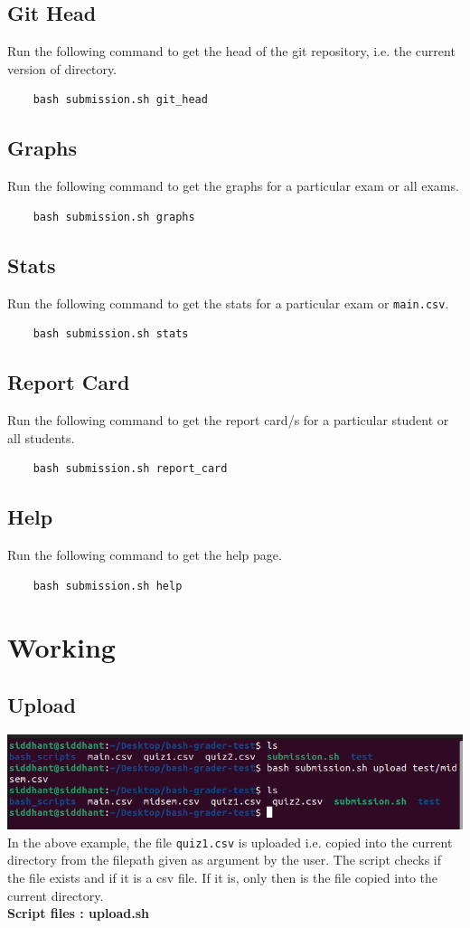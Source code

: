 \documentclass{article}
\begin{document}
\subsection{Git Head}
Run the following command to get the head of the git repository, i.e. the current version of directory.
\begin{verbatim}
    bash submission.sh git_head
\end{verbatim}

\subsection{Graphs}
Run the following command to get the graphs for a particular exam or all exams.
\begin{verbatim}
    bash submission.sh graphs
\end{verbatim}

\subsection{Stats}
Run the following command to get the stats for a particular exam or \verb"main.csv".
\begin{verbatim}
    bash submission.sh stats
\end{verbatim}

\subsection{Report Card}
Run the following command to get the report card/s for a particular student or all students.  
\begin{verbatim}
    bash submission.sh report_card
\end{verbatim}

\subsection{Help}
Run the following command to get the help page.
\begin{verbatim}
    bash submission.sh help
\end{verbatim}

\section{Working}
\subsection{Upload}
\includegraphics[width=\textwidth]{upload.png}
In the above example, the file \verb"quiz1.csv" is uploaded i.e. copied into the current directory from the filepath given as argument by the user.
The script checks if the file exists and if it is a csv file. If it is, only then is the file copied into the current directory.\\
\textbf{Script files : upload.sh }
\end{document}
